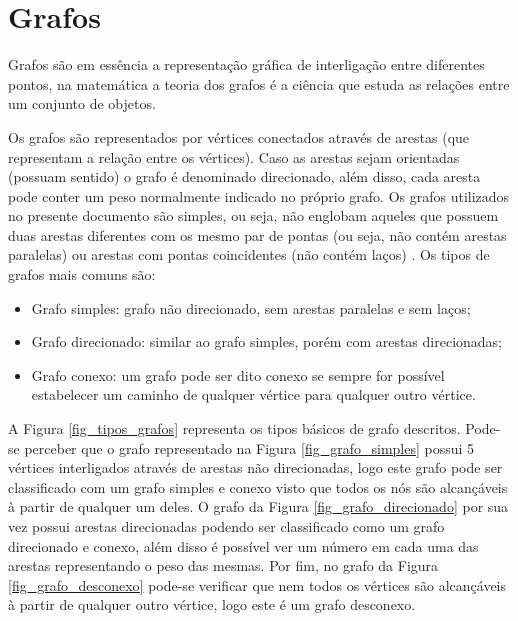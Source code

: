 \section{Grafos}
\label{chap_grafos}
Grafos são em essência a representação gráfica de interligação entre diferentes pontos, na matemática a teoria dos grafos é a ciência que estuda as relações entre um conjunto de objetos.

Os grafos são representados por vértices conectados através de arestas (que representam a relação entre os vértices). Caso as arestas sejam orientadas (possuam sentido) o grafo é denominado direcionado, além disso, cada aresta pode conter um peso normalmente indicado no próprio grafo. Os grafos utilizados no presente documento são simples, ou seja, não englobam aqueles que possuem duas arestas diferentes com os mesmo par de pontas (ou seja, não contém arestas paralelas) ou arestas com pontas coincidentes (não contém laços) \cite{Man-Feofiloff2011}. Os tipos de grafos mais comuns são:

\begin{itemize}
	\item Grafo simples: grafo não direcionado, sem arestas paralelas e sem laços;
	\item Grafo direcionado: similar ao grafo simples, porém com arestas direcionadas;
	\item Grafo conexo: um grafo pode ser dito conexo se sempre for possível estabelecer um caminho de qualquer vértice para qualquer outro vértice.
\end{itemize}

A Figura \ref{fig_tipos_grafos} representa os tipos básicos de grafo descritos. Pode-se perceber que o grafo representado na Figura \ref{fig_grafo_simples} possui 5 vértices interligados através de arestas não direcionadas, logo este grafo pode ser classificado com um grafo simples e conexo visto que todos os nós são alcançáveis à partir de qualquer um deles. O grafo da Figura \ref{fig_grafo_direcionado} por sua vez possui arestas direcionadas podendo ser classificado como um grafo direcionado e conexo, além disso é possível ver um número em cada uma das arestas representando o peso das mesmas. Por fim, no grafo da Figura \ref{fig_grafo_desconexo} pode-se verificar que nem todos os vértices são alcançáveis à partir de qualquer outro vértice, logo este é um grafo desconexo.

